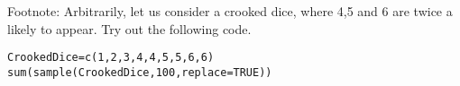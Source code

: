 Footnote: Arbitrarily, let us consider a crooked dice, where 4,5 and 6 are twice a likely to appear. Try out the following code.
\begin{verbatim}
CrookedDice=c(1,2,3,4,4,5,5,6,6)
sum(sample(CrookedDice,100,replace=TRUE))
\end{verbatim}

